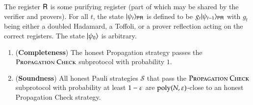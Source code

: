 The register ${\mathsf{R}}$ is some purifying register (part of which may be shared by the verifier and provers). For all $t$, the state $|\psi_t\rangle_{{\mathsf{P}} {\mathsf{R}}}$ is defined to be $g_t |\psi_{t-1}\rangle_{{\mathsf{P}} {\mathsf{R}}}$ with $g_t$ being either a doubled Hadamard, a Toffoli, or a prover reflection acting on the correct registers. The state $|\psi_0\rangle$ is arbitrary.

\begin{theorem}	
\label{thm:prop_check}
\begin{enumerate}
\item (\textbf{Completeness}) The honest Propagation strategy passes the $\textsc{Propagation Check}$ subprotocol with probability $1$. 
\item (\textbf{Soundness}) All honest Pauli strategies $\mathcal{S}$ that pass the $\textsc{Propagation Check}$ subprotocol with probability at least $1 - \varepsilon$ are $\operatorname{poly}(N,\varepsilon)$-close to an honest Propagation Check strategy. 
\end{enumerate}
\end{theorem}
